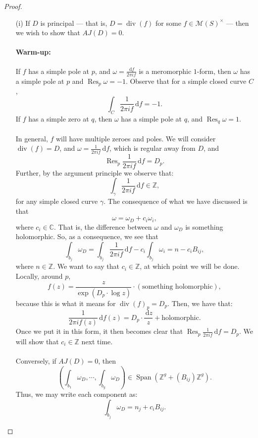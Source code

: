\documentclass[a4paper]{report}
\theoremstyle{definition}
\theoremstyle{remark}
\theoremstyle{proposition}
\theoremstyle{conjecture}
\theoremstyle{lemma}
\theoremstyle{corollary}
\theoremstyle{exercise}
\theoremstyle{example}
\newcommand{\C}{\mathbb{C}}
\newcommand{\mcal}{\mathcal}
\newcommand{\diff}{\,\mathrm{d}}
\newcommand{\on}{\operatorname}
\begin{document}
\begin{proof}
    \leavevmode
    \begin{itemize}
        \item[(i)] If $D$ is principal --- that is, $D = \on{div}(f)$
            for some $f\in \mcal{M}(S)^\times$ --- then we wish 
            to show that $AJ(D) = 0$.
            \paragraph{Warm-up:} If $f$ has a simple pole at $p$, and 
            $\omega = \frac{\diff f}{2\pi if}$ is a meromorphic $1$-form,
            then $\omega$ has a simple pole at $p$ and $\on{Res}_p\omega=-1$.
            Observe that for a simple closed curve $C$,
            $$\int_C \frac{1}{2\pi if}\diff f = -1.$$
            If $f$ has a simple zero at $q$, then $\omega$ has a simple 
            pole at $q$, and $\on{Res}_q\omega = 1$.\\\\
            In general, $f$ will have multiple zeroes and poles.
            We will consider $\on{div}(f) = D$, and 
            $\omega = \frac{1}{2\pi if}\diff f$, which is regular away from 
            $D$, and $$\on{Res}_p \frac{1}{2\pi if}\diff f = D_p.$$
            Further, by the argument principle we observe that:
            $$\int_\gamma \frac{1}{2\pi if}\diff f \in\mathbb{Z},$$
            for any simple closed curve $\gamma$.
            The consequence of what we have discussed is that 
            $$\omega = \omega_D + c_i \omega_i,$$
            where $c_i\in \C$. That is, the difference between $\omega$
            and $\omega_D$ is something holomorphic.
            So, as a consequence, we see that 
            $$\int_{b_j}\omega_D = \int_{b_j}\frac{1}{2\pi if}\diff f - c_i\int_{b_j}\omega_i = n - c_iB_{ij},$$
            where $n\in\mathbb{Z}$.
            We want to say that $c_i \in \mathbb{Z}$, at which point we will 
            be done.
            Locally, around $p$,
            $$f(z) = \frac{z}{\exp(D_p\cdot \log z)}\cdot \left(\text{something holomorphic}\right),$$
            because this is what it means for $\on{div}(f)_p = D_p$.
            Then, we have that:
            $$\frac{1}{2\pi if(z)}\diff f(z) = D_p \cdot \frac{\diff z}{z} + \text{holomorphic}.$$
            Once we put it in this form, it then becomes clear that 
            $\on{Res}_p\frac{1}{2\pi if}\diff f = D_p$.
            We will show that $c_i\in\mathbb{Z}$ next time.\\\\
            Conversely, if $AJ(D) = 0$, then 
            $$\left(\int_{b_1}\omega_D,\cdots,\int_{b_g}\omega_D\right)\in \on{Span}(\mathbb{Z}^g + (B_{ij})\mathbb{Z}^g).$$
            Thus, we may write each component as:
            $$\int_{b_j}\omega_D = n_j + c_iB_{ij}.$$
    \end{itemize}
\end{proof}
\end{document}
